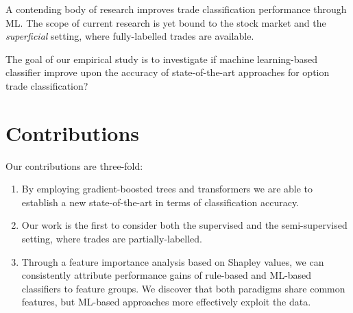 A contending body of research \autocites{blazejewskiLocalNonParametricModel2005}{rosenthalModelingTradeDirection2012}{ronenMachineLearningTrade2022} improves trade classification performance through \gls{ML}. The scope of current research is yet bound to the stock market and the \textit{superficial} setting, where fully-labelled trades are available. 

The goal of our empirical study is to investigate if machine learning-based classifier improve upon the accuracy of state-of-the-art approaches for option trade classification?

\section{Contributions}


Our contributions are three-fold: 
\begin{enumerate}[label=(\roman*),noitemsep]
\item By employing gradient-boosted trees and transformers we are able to establish a new state-of-the-art in terms of classification accuracy. 
\item Our work is the first to consider both the supervised and the semi-supervised setting, where trades are partially-labelled.
\item Through a feature importance analysis based on Shapley values, we can consistently attribute performance gains of rule-based and \gls{ML}-based classifiers to feature groups. We discover that both paradigms share common features, but \gls{ML}-based approaches more effectively exploit the data. %
\end{enumerate}










